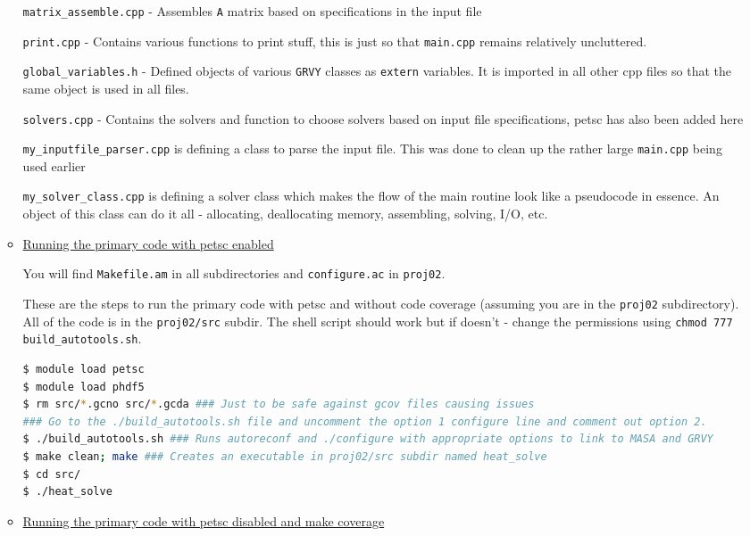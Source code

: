 \documentclass[12 pt, final]{article}
\begin{document}
\begin{itemize}
\begin{itemize}
        \texttt{matrix\_assemble.cpp} - Assembles \texttt{A} matrix based on specifications in the input file
        
        \texttt{print.cpp} - Contains various functions to print stuff, this is just so that \texttt{main.cpp} remains relatively uncluttered.
        
        \texttt{global\_variables.h} - Defined objects of various \texttt{GRVY} classes as \texttt{extern} variables. It is imported in all other cpp files so that the same object is used in all files.
        
        \texttt{solvers.cpp} - Contains the solvers and function to choose solvers based on input file specifications, petsc has also been added here

        
        \texttt{my\_inputfile\_parser.cpp} is defining a class to parse the input file. This was done to clean up the rather large \texttt{main.cpp} being used earlier
        
        \texttt{my\_solver\_class.cpp} is defining a solver class which makes the flow of the main routine look like a pseudocode in essence. An object of this class can do it all - allocating, deallocating memory, assembling, solving, I/O, etc.

        \item \underline{Running the primary code with petsc enabled}
        
        You will find \texttt{Makefile.am} in all subdirectories and \texttt{configure.ac} in \texttt{proj02}.
        
        These are the steps to run the primary code with petsc and without code coverage (assuming you are in the \texttt{proj02} subdirectory). All of the code is in the \texttt{proj02/src} subdir. The shell script should work but if doesn't - change the permissions using \texttt{chmod 777 build\_autotools.sh}.
        \begin{lstlisting}[language = bash]
$ module load petsc
$ module load phdf5
$ rm src/*.gcno src/*.gcda ### Just to be safe against gcov files causing issues
### Go to the ./build_autotools.sh file and uncomment the option 1 configure line and comment out option 2.
$ ./build_autotools.sh ### Runs autoreconf and ./configure with appropriate options to link to MASA and GRVY
$ make clean; make ### Creates an executable in proj02/src subdir named heat_solve
$ cd src/
$ ./heat_solve
        \end{lstlisting}
        
        \item \underline{Running the primary code with petsc disabled and make coverage}
        

\end{itemize}
\end{itemize}
\end{document}
